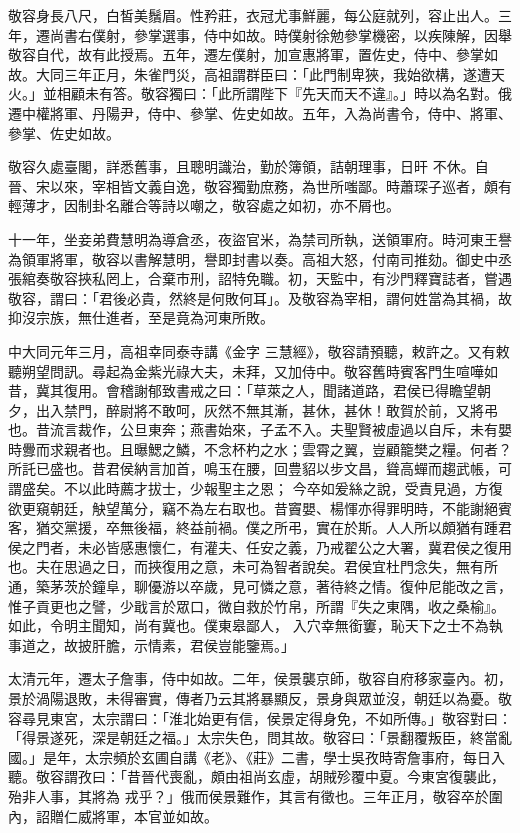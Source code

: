 \begin{pinyinscope}
 敬容身長八尺，白皙美鬚眉。性矜莊，衣冠尤事鮮麗，每公庭就列，容止出人。三年，遷尚書右僕射，參掌選事，侍中如故。時僕射徐勉參掌機密，以疾陳解，因舉敬容自代，故有此授焉。五年，遷左僕射，加宣惠將軍，置佐史，侍中、參掌如故。大同三年正月，朱雀門災，高祖謂群臣曰：「此門制卑狹，我始欲構，遂遭天火。」並相顧未有答。敬容獨曰：「此所謂陛下『先天而天不違』。」時以為名對。俄遷中權將軍、丹陽尹，侍中、參掌、佐史如故。五年，入為尚書令，侍中、將軍、參掌、佐史如故。



 敬容久處臺閣，詳悉舊事，且聰明識治，勤於簿領，詰朝理事，日旰
 不休。自晉、宋以來，宰相皆文義自逸，敬容獨勤庶務，為世所嗤鄙。時蕭琛子巡者，頗有輕薄才，因制卦名離合等詩以嘲之，敬容處之如初，亦不屑也。



 十一年，坐妾弟費慧明為導倉丞，夜盜官米，為禁司所執，送領軍府。時河東王譽為領軍將軍，敬容以書解慧明，譽即封書以奏。高祖大怒，付南司推劾。御史中丞張綰奏敬容挾私罔上，合棄市刑，詔特免職。初，天監中，有沙門釋寶誌者，嘗遇敬容，謂曰：「君後必貴，然終是何敗何耳」。及敬容為宰相，謂何姓當為其禍，故抑沒宗族，無仕進者，至是竟為河東所敗。



 中大同元年三月，高祖幸同泰寺講《金字
 三慧經》，敬容請預聽，敕許之。又有敕聽朔望問訊。尋起為金紫光祿大夫，未拜，又加侍中。敬容舊時賓客門生喧嘩如昔，冀其復用。會稽謝郁致書戒之曰：「草萊之人，聞諸道路，君侯已得瞻望朝夕，出入禁門，醉尉將不敢呵，灰然不無其漸，甚休，甚休！敢賀於前，又將弔也。昔流言裁作，公旦東奔；燕書始來，子孟不入。夫聖賢被虛過以自斥，未有嬰時釁而求親者也。且曝鰓之鱗，不念杯杓之水；雲霄之翼，豈顧籠樊之糧。何者？所託已盛也。昔君侯納言加首，鳴玉在腰，回豊貂以步文昌，聳高蟬而趨武帳，可謂盛矣。不以此時薦才拔士，少報聖主之恩；
 今卒如爰絲之說，受責見過，方復欲更窺朝廷，觖望萬分，竊不為左右取也。昔竇嬰、楊惲亦得罪明時，不能謝絕賓客，猶交黨援，卒無後福，終益前禍。僕之所弔，實在於斯。人人所以頗猶有踵君侯之門者，未必皆感惠懷仁，有灌夫、任安之義，乃戒翟公之大署，冀君侯之復用也。夫在思過之日，而挾復用之意，未可為智者說矣。君侯宜杜門念失，無有所通，築茅茨於鐘阜，聊優游以卒歲，見可憐之意，著待終之情。復仲尼能改之言，惟子貢更也之譬，少戢言於眾口，微自救於竹帛，所謂『失之東隅，收之桑榆』。如此，令明主聞知，尚有冀也。僕東皋鄙人，
 入穴幸無銜窶，恥天下之士不為執事道之，故披肝膽，示情素，君侯豈能鑒焉。」



 太清元年，遷太子詹事，侍中如故。二年，侯景襲京師，敬容自府移家臺內。初，景於渦陽退敗，未得審實，傳者乃云其將暴顯反，景身與眾並沒，朝廷以為憂。敬容尋見東宮，太宗謂曰：「淮北始更有信，侯景定得身免，不如所傳。」敬容對曰：「得景遂死，深是朝廷之福。」太宗失色，問其故。敬容曰：「景翻覆叛臣，終當亂國。」是年，太宗頻於玄圃自講《老》、《莊》二書，學士吳孜時寄詹事府，每日入聽。敬容謂孜曰：「昔晉代喪亂，頗由祖尚玄虛，胡賊殄覆中夏。今東宮復襲此，殆非人事，其將為
 戎乎？」俄而侯景難作，其言有徵也。三年正月，敬容卒於圍內，詔贈仁威將軍，本官並如故。




\end{pinyinscope}
